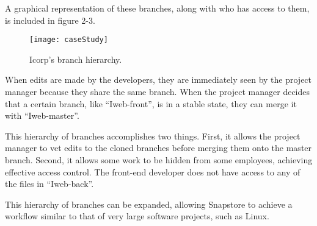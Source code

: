 A graphical representation of these branches, along with who has access to them, is included in figure 2-3.

\begin{figure}
\texttt{[image: caseStudy]}
\caption{Icorp's branch hierarchy.}
\label{arm:fig1}
\end{figure}

When edits are made by the developers, they are immediately seen by the project manager because they share the same branch. When the project manager decides that a certain branch, like ``Iweb-front'', is in a stable state, they can merge it with ``Iweb-master''.

This hierarchy of branches accomplishes two things. First, it allows the project manager to vet edits to the cloned branches before merging them onto the master branch. Second, it allows some work to be hidden from some employees, achieving effective access control. The front-end developer does not have access to any of the files in ``Iweb-back''.

This hierarchy of branches can be expanded, allowing Snapstore to achieve a workflow similar to that of very large software projects, such as Linux. 




